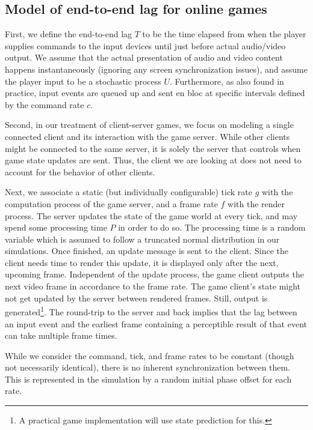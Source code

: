 \subsection{Model of end-to-end lag for online games}
First, we define the end-to-end lag $T$ to be the time elapsed from when the player supplies commands to the input devices until just before actual audio/video output.
We assume that the actual presentation of audio and video content happens instantaneously (ignoring any screen synchronization issues), and assume the player input to be a stochastic process $U$. %
Furthermore, as also found in practice, input events are queued up and sent en bloc at specific intervals defined by the command rate $c$.

Second, in our treatment of client-server games, we focus on modeling a single connected client and its interaction with the game server. While other clients might be connected to the same server, it is solely the server that controls when game state updates are sent. Thus, the client we are looking at does not need to account for the behavior of other clients.

Next, we associate a static (but individually configurable) tick rate $g$ with the computation process of the game server, and a frame rate $f$ with the render process. The server updates the state of the game world at every tick, and may spend some processing time $P$ in order to do so. The processing time is a random variable which is assumed to follow a truncated normal distribution in our simulations. Once finished, an update message is sent to the client. Since the client needs time to render this update, it is displayed only after the next, upcoming frame. Independent of the update process, the game client outputs the next video frame in accordance to the frame rate. The game client's state might not get updated by the server between rendered frames. Still, output is generated\footnote{A practical game implementation will use state prediction for this.}. The round-trip to the server and back implies that the lag between an input event and the earliest frame containing a perceptible result of that event can take multiple frame times.

While we consider the command, tick, and frame rates to be constant (though not necessarily identical), there is no inherent synchronization between them. This is represented in the simulation by a random initial phase offset for each rate.

